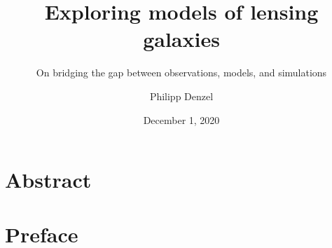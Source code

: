 \documentclass[
    fontsize=10pt,
    twoside=true,
    numbers=noenddot
]{cls/phdbyphd}
\begin{document}


\titlehead{Doctoral Dissertation}

\subject{Doctoral Dissertation}
\title[Exploring models of lensing galaxies]{
    Exploring models of lensing galaxies
}
\subtitle{On bridging the gap between observations, models, and simulations}

\author[Philipp Denzel]{Philipp Denzel}
\date{December 1, 2020}
\publishers{University of Z\"urich}

\frontmatter
{}

\dedication{
	For the one who will never read it.\\
	\flushright -- Philipp Denzel
}

\maketitle


\chapter*{Abstract}
    

\chapter*{Preface}
    

\begingroup

    \setlength{\textheight}{23cm}
    \etocstandarddisplaystyle
    \etocstandardlines

    \tableofcontents

    \listoffigures
\end{document}
